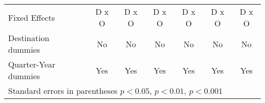 \begin{table}[htbp]
\begin{tabular}{l*{6}{c}}
Fixed Effects       &       D x O         &       D x O         &       D x O         &       D x O         &       D x O         &       D x O         \\
Destination dummies &          No         &          No         &          No         &          No         &          No         &          No         \\
Quarter-Year dummies&         Yes         &         Yes         &         Yes         &         Yes         &         Yes         &         Yes         \\
\hline\hline
\multicolumn{7}{l}{Standard errors in parentheses \sym{*} \(p<0.05\), \sym{**} \(p<0.01\), \sym{***} \(p<0.001\)}\\
\end{tabular}
\end{table}
